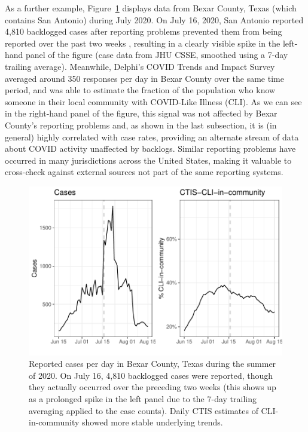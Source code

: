 \documentclass[9pt,twocolumn,twoside,lineno]{pnas-new}
\begin{document}
As a further example, Figure~\ref{fig:bexar_compare} displays data from Bexar
County, Texas (which contains San Antonio) during July 2020. On July 16, 2020,
San Antonio reported 4,810 backlogged cases after reporting problems prevented
them from being reported over the past two weeks \cite{Palacios:2021}, resulting
in a clearly visible spike in the left-hand panel of the figure (case data from
JHU CSSE, smoothed using a 7-day trailing average). Meanwhile, Delphi's COVID
Trends and Impact Survey averaged around 350 responses per day in Bexar County
over the same time period, and was able to estimate the fraction of the
population who know someone in their local community with COVID-Like Illness
(CLI). As we can see in the right-hand panel of the figure, this signal was not
affected by Bexar County's reporting problems and, as shown in the last
subsection, it is (in general) highly correlated with case rates, providing an
alternate stream of data about COVID activity unaffected by backlogs. Similar
reporting problems have occurred in many jurisdictions across the United States,
making it valuable to cross-check against external sources not part of the same
reporting systems.

\begin{figure}[t]
  \includegraphics[width=\columnwidth]{fig/bexar_compare.pdf}
  \caption{Reported cases per day in Bexar County, Texas during the summer of
    2020. On July 16, 4,810 backlogged cases were reported, though they actually
    occurred over the preceding two weeks (this shows up as a prolonged spike in
    the left panel due to the 7-day trailing averaging applied to the case
    counts). Daily CTIS estimates of CLI-in-community showed more stable
    underlying trends.}
  \label{fig:bexar_compare}
\end{figure}
\end{document}
